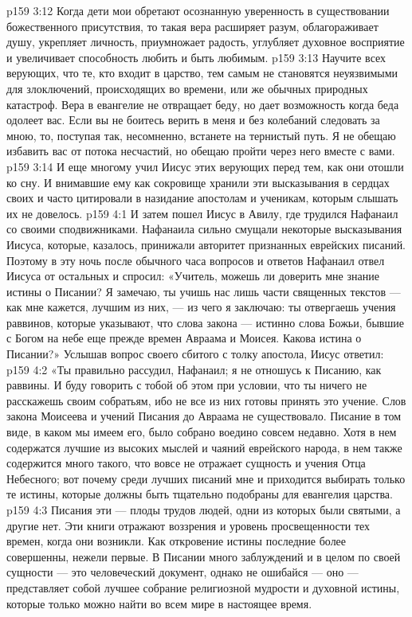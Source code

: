 \vs p159 3:12 \pc Когда дети мои обретают осознанную уверенность в существовании божественного присутствия, то такая вера расширяет разум, облагораживает душу, укрепляет личность, приумножает радость, углубляет духовное восприятие и увеличивает способность любить и быть любимым.
\vs p159 3:13 Научите всех верующих, что те, кто входит в царство, тем самым не становятся неуязвимыми для злоключений, происходящих во времени, или же обычных природных катастроф. Вера в евангелие не отвращает беду, но дает возможность  когда беда одолеет вас. Если вы не боитесь верить в меня и без колебаний следовать за мною, то, поступая так, несомненно, встанете на тернистый путь. Я не обещаю избавить вас от потока несчастий, но обещаю пройти через него вместе с вами.
\vs p159 3:14 \pc И еще многому учил Иисус этих верующих перед тем, как они отошли ко сну. И внимавшие ему как сокровище хранили эти высказывания в сердцах своих и часто цитировали в назидание апостолам и ученикам, которым слышать их не довелось.
\vs p159 4:1 И затем пошел Иисус в Авилу, где трудился Нафанаил со своими сподвижниками. Нафанаила сильно смущали некоторые высказывания Иисуса, которые, казалось, принижали авторитет признанных еврейских писаний. Поэтому в эту ночь после обычного часа вопросов и ответов Нафанаил отвел Иисуса от остальных и спросил: «Учитель, можешь ли доверить мне знание истины о Писании? Я замечаю, ты учишь нас лишь части священных текстов --- как мне кажется, лучшим из них, --- из чего я заключаю: ты отвергаешь учения раввинов, которые указывают, что слова закона --- истинно слова Божьи, бывшие с Богом на небе еще прежде времен Авраама и Моисея. Какова истина о Писании?» Услышав вопрос своего сбитого с толку апостола, Иисус ответил:
\vs p159 4:2 \pc «Ты правильно рассудил, Нафанаил; я не отношусь к Писанию, как раввины. И буду говорить с тобой об этом при условии, что ты ничего не расскажешь своим собратьям, ибо не все из них готовы принять это учение. Слов закона Моисеева и учений Писания до Авраама не существовало. Писание в том виде, в каком мы имеем его, было собрано воедино совсем недавно. Хотя в нем содержатся лучшие из высоких мыслей и чаяний еврейского народа, в нем также содержится много такого, что вовсе не отражает сущность и учения Отца Небесного; вот почему среди лучших писаний мне и приходится выбирать только те истины, которые должны быть тщательно подобраны для евангелия царства.
\vs p159 4:3 Писания эти --- плоды трудов людей, одни из которых были святыми, а другие нет. Эти книги отражают воззрения и уровень просвещенности тех времен, когда они возникли. Как откровение истины последние более совершенны, нежели первые. В Писании много заблуждений и в целом по своей сущности --- это человеческий документ, однако не ошибайся --- оно --- представляет собой лучшее собрание религиозной мудрости и духовной истины, которые только можно найти во всем мире в настоящее время.
